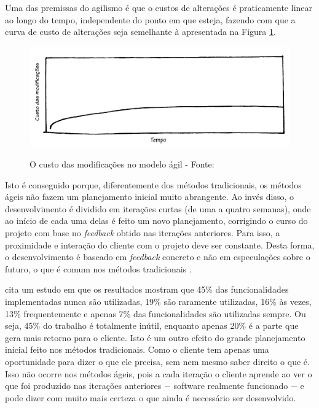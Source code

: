 Uma das premissas do agilismo é que o custos de alterações é praticamente linear ao longo do tempo, independente do ponto em que esteja, fazendo com que a curva de custo de alterações seja semelhante à apresentada na Figura \ref{img:custo-agile}.

\begin{figure}[h]
  \center
  \caption{O custo das modificações no modelo ágil - Fonte: \cite{XPKent}}
  \includegraphics[scale=0.45]{images/custo-agile}
  \label{img:custo-agile}
\end{figure}

Isto é conseguido porque, diferentemente dos métodos tradicionais, os métodos ágeis não fazem um planejamento inicial muito abrangente. Ao invés disso, o desenvolvimento é dividido em iterações curtas (de uma a quatro semanas), onde ao início de cada uma delas é feito um novo planejamento, corrigindo o curso do projeto com base no \textit{feedback} obtido nas iterações anteriores. Para isso, a proximidade e interação do cliente com o projeto deve ser constante. Desta forma, o desenvolvimento é baseado em \textit{feedback} concreto e não em especulações sobre o futuro, o que é comum nos métodos tradicionais \cite{BDDRodrigo}.

 cita um estudo em que os resultados mostram que 45\% das funcionalidades implementadas nunca são utilizadas, 19\% são raramente utilizadas, 16\% às vezes, 13\% frequentemente e apenas 7\% das funcionalidades são utilizadas sempre. Ou seja, 45\% do trabalho é totalmente inútil, enquanto apenas 20\% é a parte que gera mais retorno para o cliente. Isto é um outro efeito do grande planejamento inicial feito nos métodos tradicionais. Como o cliente tem apenas uma oportunidade para dizer o que ele precisa, sem nem mesmo saber direito o que é. Isso não ocorre nos métodos ágeis, pois a cada iteração o cliente aprende ao ver o que foi produzido nas iterações anteriores $-$ software realmente funcionado $-$ e pode dizer com muito mais certeza o que ainda é necessário ser desenvolvido.

